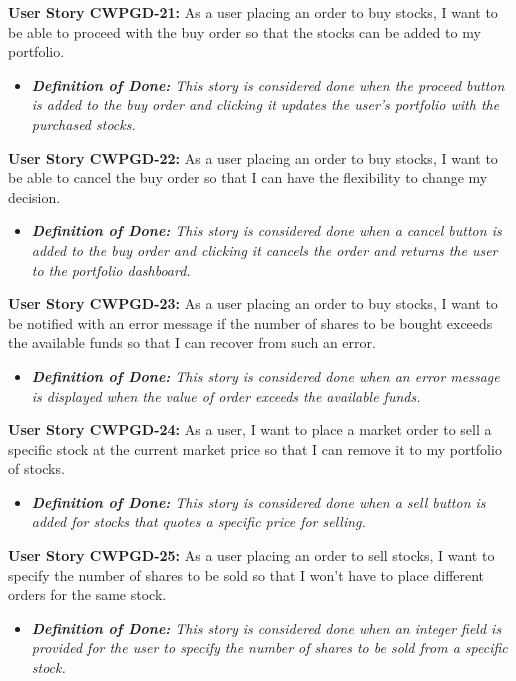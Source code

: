 \noindent \textbf{User Story CWPGD-21:} As a user placing an order to buy stocks, I want to be able to proceed with the buy order so that the stocks can be added to my portfolio.
\begin{itemize}
	\item \textit{\textbf{Definition of Done:} This story is considered done when the proceed button is added to the buy order and clicking it updates the user’s portfolio with the purchased stocks.} 
\end{itemize}

\noindent \textbf{User Story CWPGD-22:} As a user placing an order to buy stocks, I want to be able to cancel the buy order so that I can have the flexibility to change my decision.
\begin{itemize}
	\item \textit{\textbf{Definition of Done:} This story is considered done when a cancel button is added to the buy order and clicking it cancels the order and returns the user to the portfolio dashboard.} 
\end{itemize}

\noindent \textbf{User Story CWPGD-23:} As a user placing an order to buy stocks, I want to be notified with an error message if the number of shares to be bought exceeds the available funds so that I can recover from such an error.
\begin{itemize}
	\item \textit{\textbf{Definition of Done:} This story is considered done when an error message is displayed when the value of order exceeds the available funds.} 
\end{itemize}

\noindent \textbf{User Story CWPGD-24:} As a user, I want to place a market order to sell a specific stock at the current market price so that I can remove it to my portfolio of stocks.
\begin{itemize}
	\item \textit{\textbf{Definition of Done:} This story is considered done when a sell button is added for stocks that quotes a specific price for selling.} 
\end{itemize}

\noindent \textbf{User Story CWPGD-25:} As a user placing an order to sell stocks, I want to specify the number of shares to be sold so that I won’t have to place different orders for the same stock.
\begin{itemize}
	\item \textit{\textbf{Definition of Done:} This story is considered done when an integer field is provided for the user to specify the number of shares to be sold from a specific stock.} 
\end{itemize}

